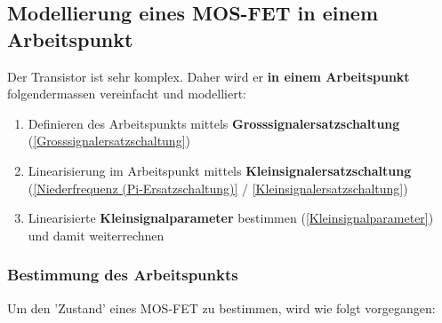 \subsection{Modellierung eines MOS-FET in einem Arbeitspunkt}

Der Transistor ist sehr komplex.
Daher wird er \textbf{in einem Arbeitspunkt} folgendermassen vereinfacht  und modelliert:

\begin{enumerate}
    \item Definieren des Arbeitspunkts mittels \textbf{Grosssignalersatzschaltung} (\ref{Grosssignalersatzschaltung})
    \item Linearisierung im Arbeitspunkt mittels \textbf{Kleinsignalersatzschaltung} (\ref{Niederfrequenz (Pi-Ersatzschaltung)} / \ref{Kleinsignalersatzschaltung})
    \item Linearisierte \textbf{Kleinsignalparameter} bestimmen (\ref{Kleinsignalparameter}) und damit weiterrechnen
\end{enumerate}


\subsubsection{Bestimmung des Arbeitspunkts}
\label{Bestimmung des Arbeitspunkts}
Um den 'Zustand' eines MOS-FET zu bestimmen, wird wie folgt vorgegangen:

\smallskip

